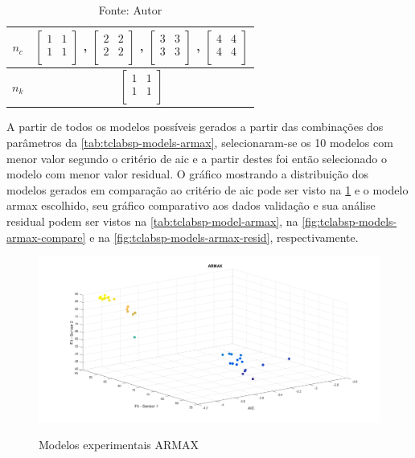 \begin{table}[h]
\begin{tabular}{c|c}
		$n_c$			&
							$ \begin{bmatrix}	1	&	1	\\	1	&	1	\\	\end{bmatrix} $	,		
							$ \begin{bmatrix}	2	&	2	\\	2	&	2	\\	\end{bmatrix} $	,		
							$ \begin{bmatrix}	3	&	3	\\	3	&	3	\\	\end{bmatrix} $	,		
							$ \begin{bmatrix}	4	&	4	\\	4	&	4	\\	\end{bmatrix} $		\\ \midrule
		$n_k$			&
							$ \begin{bmatrix}	1	&	1	\\	1	&	1	\\	\end{bmatrix} $		\\ \bottomrule
	\end{tabular}
	\caption*{Fonte: Autor}
\end{table}

A partir de todos os modelos possíveis gerados a partir das combinações dos parâmetros da \cref{tab:tclabsp-models-armax},
selecionaram-se os 10 modelos com menor valor segundo o critério de \acrshort{aic} e a partir destes foi então
selecionado o modelo com menor valor residual.
O gráfico mostrando a distribuição dos modelos gerados em comparação ao critério de \acrshort{aic} pode ser
visto na \cref{fig:tclabsp-models-armax} e o modelo \acrshort{armax} escolhido, seu gráfico comparativo aos dados validação
e sua análise residual podem ser vistos na \cref{tab:tclabsp-model-armax}, na \cref{fig:tclabsp-models-armax-compare} e na
\cref{fig:tclabsp-models-armax-resid}, respectivamente.

\begin{figure}[h]
	\caption{Modelos experimentais ARMAX}
	\begin{center}
		\includegraphics[width=1.00\textwidth]{./5_images/tclabsp-models-ARMAX.png} 
		\label{fig:tclabsp-models-armax}
	\end{center}
	\centering
\end{figure}

